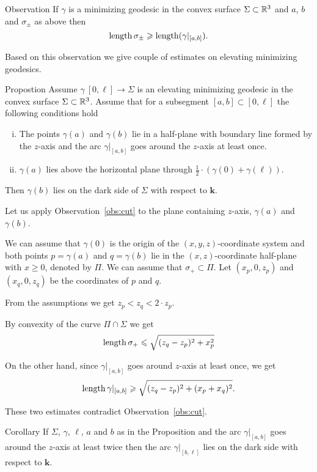 \documentclass[a4paper,10pt]{amsart}
\begin{document}
\begin{thm}{Observation}\label{obs:cut}
If $\gamma$ is a minimizing geodesic in the convex surface $\Sigma\subset \mathbb{R}^3$ and $a$, $b$ and $\sigma_\pm$ as above then
\[\mathop{\rm length}\nolimits\sigma_\pm\geqslant\mathop{\rm length}\nolimits(\gamma|_{[a,b]}).\]
\end{thm}

Based on this observation we give couple of estimates on elevating minimizing geodesics.

\begin{thm}{Propostion}\label{prop:around-once}
Assume $\gamma\:[0,\ell]\to \Sigma$ is an elevating minimizing geodesic in the convex surface $\Sigma\subset \mathbb{R}^3$.
Assume that for a subsegment $[a,b]\subset [0,\ell]$ the following conditions hold
\begin{enumerate}[(i)]
\item The points $\gamma(a)$ and $\gamma(b)$ lie in a half-plane with boundary line formed by the $z$-axis
and  the arc $\gamma|_{[a,b]}$ goes around the $z$-axis at least once.
\item $\gamma(a)$ lies above the horizontal plane through $\tfrac12\cdot(\gamma(0)+\gamma(\ell))$.
\end{enumerate}
Then  $\gamma(b)$ lies on the dark side of $\Sigma$ with respect to $\bm{k}$.
\end{thm}

Let us apply Observation~\ref{obs:cut} to the plane containing $z$-axis, $\gamma(a)$ and $\gamma(b)$.


We can assume that $\gamma(0)$ is the origin of the $(x,y,z)$-coordinate system
and both points $p=\gamma(a)$ and $q=\gamma(b)$ lie in the $(x,z)$-coordinate half-plane with $x\ge 0$, denoted by $\Pi$.
We can assume that $\sigma_+\subset \Pi$.
Let $(x_p,0,z_p)$ and $(x_q,0,z_q)$ be the coordinates of $p$ and $q$.

From the assumptions we get $z_p<z_q<2\cdot z_p$.

By convexity of the curve $\Pi\cap \Sigma$
we get 
\[\mathop{\rm length}\nolimits\sigma_+\leqslant \sqrt{(z_q-z_p)^2+x_p^2}\]

On the other hand, since $\gamma|_{[a,b]}$ goes around $z$-axis at least once,
we get 
\[\mathop{\rm length}\nolimits\gamma|_{[a,b]}\geqslant \sqrt{(z_q-z_p)^2+(x_p+x_q)^2}.\]

These two estimates contradict Observation~\ref{obs:cut}.
\qeds

\begin{thm}{Corollary}\label{cor:around-twice}
If $\Sigma$, $\gamma$, $\ell$, $a$ and $b$ as in the Proposition and the arc $\gamma|_{[a,b]}$ goes around the $z$-axis at least twice
then the arc $\gamma|_{[b,\ell]}$ lies on the dark side with respect to $\bm{k}$.
\end{thm}
\end{document}
